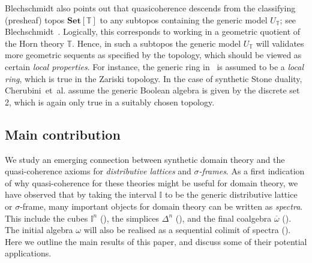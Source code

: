 \documentclass[12pt]{amsart}
\theoremstyle{definition}
\newcommand{\mb}[1]{\mathbf{#1}}
\newcommand{\mbb}[1]{\mathbb{#1}}
\newcommand{\T}{\mbb T}
\newcommand{\I}{\mbb I}
\newcommand{\Set}{\mb{Set}}
\newcommand{\ov}[1]{\overline{#1}}
\begin{document}
Blechschmidt also points out that quasicoherence descends from the classifying (presheaf) topos $\Set[\T]$ to any subtopos containing the generic model $U_\T$; see Blechschmidt~\cite[Cor. 7.7]{blechschmidt2020general}. Logically, this corresponds to working in a geometric quotient of the Horn theory $\T$.  Hence, in such a subtopos the generic model $U_\T$ will validates more geometric sequents as specified by the topology, which should be viewed as certain \emph{local properties}. For instance, the generic ring in~\cite{Cherubini_Coquand_Hutzler_2024} is assumed to be a \emph{local ring}, which is true in the Zariski topology. In the case of synthetic Stone duality, Cherubini~et~al.\cite{cherubini2024foundation} assume the generic Boolean algebra is given by the discrete set 2, which is again only true in a suitably chosen topology. 


\subsection{Main contribution}\label{sec:contributions}

We study an emerging connection between synthetic domain theory and the quasi-coherence axioms for \emph{distributive lattices} and \emph{$\sigma$-frames}. As a first indication of why quasi-coherence for these theories might be useful for domain theory, we have observed that by taking the interval $\I$ to be the generic distributive lattice or $\sigma$-frame, many important objects for domain theory can be written as \emph{spectra}. This include the cubes $\I^n$ (), the simplices $\Delta^n$ (), and the final coalgebra $\ov\omega$ (). The initial algebra $\omega$ will also be realised as a sequential colimit of spectra (). Here we outline the main results of this paper, and discuss some of their potential applications.
\end{document}
